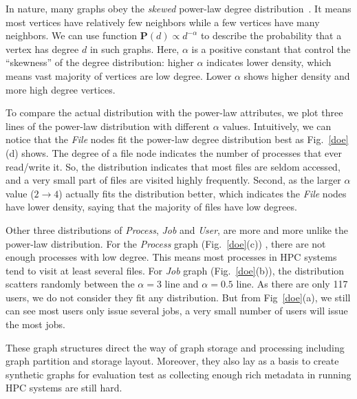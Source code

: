 In nature, many graphs obey the \textit{skewed} power-law degree distribution~\cite{faloutsos1999power}. It means most vertices have relatively few neighbors while a few vertices have many neighbors. We can use function $\textbf{P}(d) \propto d^{-\alpha}$ to describe the probability that a vertex has degree $d$ in such graphs. Here, $\alpha$ is a positive constant that control the ``skewness'' of the degree distribution: higher $\alpha$ indicates lower density, which means vast majority of vertices are low degree. Lower $\alpha$ shows higher density and more high degree vertices. 

To compare the actual distribution with the power-law attributes, we plot three lines of the power-law distribution with different $\alpha$ values. Intuitively, we can notice that the \textit{File} nodes fit the power-law degree distribution best as Fig.~\ref{doe}(d) shows. The degree of a file node indicates the number of processes that ever read/write it. So, the distribution indicates that most files are seldom accessed, and a very small part of files are visited highly frequently. Second, as the larger $\alpha$ value ($2 \to 4$) actually fits the distribution better, which indicates the \textit{File} nodes have lower density, saying that the majority of files have low degrees. 

Other three distributions of \textit{Process}, \textit{Job} and \textit{User}, are more and more unlike the power-law distribution. For the \textit{Process} graph (Fig.~\ref{doe}(c)) , there are not enough processes with low degree. This means most processes in HPC systems tend to visit at least several files. For \textit{Job} graph (Fig.~\ref{doe}(b)), the distribution scatters randomly between the $\alpha=3$ line and $\alpha=0.5$ line. As there are only 117 users, we do not consider they fit any distribution. But from Fig~\ref{doe}(a), we still can see most users only issue several jobs, a very small number of users will issue the most jobs.

These graph structures direct the way of graph storage and processing including graph partition and storage layout. Moreover, they also lay as a basis to create synthetic graphs for evaluation test as collecting enough rich metadata in running HPC systems are still hard.


